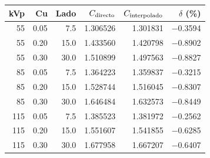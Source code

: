 \begin{tabular}{rrrrrr}\toprule
kVp & Cu & Lado & $C_{\rm directo}$ & $C_{\rm interpolado}$ & $\delta$ (\%)\\\midrule
\num{55} & \num{0.05} & \num{7.5} & \num{1.306526} & \num{1.301831} & \num{-0.3594}\\
\num{55} & \num{0.20} & \num{15.0} & \num{1.433560} & \num{1.420798} & \num{-0.8902}\\
\num{55} & \num{0.30} & \num{30.0} & \num{1.510899} & \num{1.497563} & \num{-0.8827}\\
\num{85} & \num{0.05} & \num{7.5} & \num{1.364223} & \num{1.359837} & \num{-0.3215}\\
\num{85} & \num{0.20} & \num{15.0} & \num{1.528744} & \num{1.516045} & \num{-0.8307}\\
\num{85} & \num{0.30} & \num{30.0} & \num{1.646484} & \num{1.632573} & \num{-0.8449}\\
\num{115} & \num{0.05} & \num{7.5} & \num{1.385523} & \num{1.381972} & \num{-0.2562}\\
\num{115} & \num{0.20} & \num{15.0} & \num{1.551607} & \num{1.541855} & \num{-0.6285}\\
\num{115} & \num{0.30} & \num{30.0} & \num{1.677958} & \num{1.667207} & \num{-0.6407}\\
\bottomrule\end{tabular}